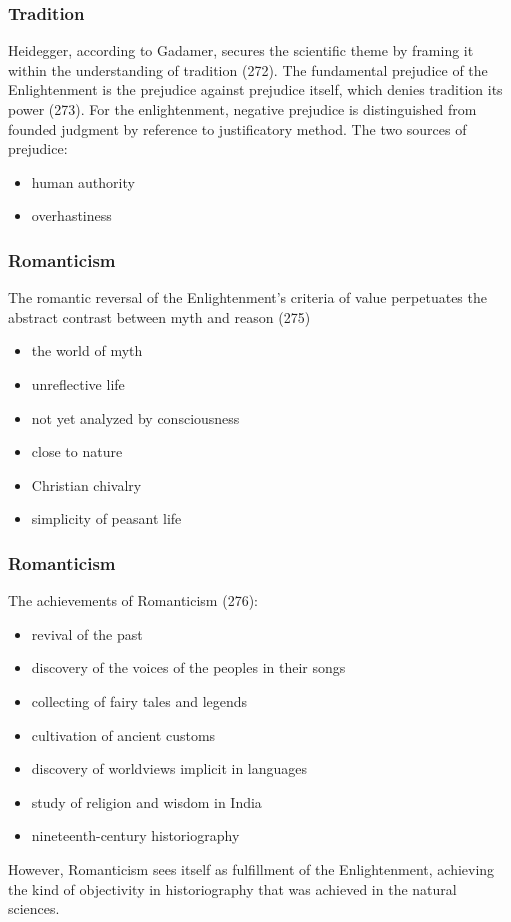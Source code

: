 \documentclass[xcolor=dvipsnames]{beamer}
\begin{document}
\begin{frame}
  \frametitle{Tradition}
  Heidegger, according to Gadamer, secures the scientific theme by
  framing it within the understanding of tradition (272). The
  fundamental prejudice of the Enlightenment is the prejudice against
  prejudice itself, which denies tradition its power (273). For the
  enlightenment, negative prejudice is distinguished from founded
  judgment by reference to justificatory method. The two sources of
  prejudice:
  \begin{itemize}
  \item human authority
  \item overhastiness
  \end{itemize}
\end{frame}

\begin{frame}
  \frametitle{Romanticism}
  The romantic reversal of the Enlightenment's criteria of value
  perpetuates the abstract contrast between myth and reason (275)
  \begin{itemize}
  \item the world of myth
  \item unreflective life
  \item not yet analyzed by consciousness
  \item close to nature
  \item Christian chivalry
  \item simplicity of peasant life
  \end{itemize}
\end{frame}

\begin{frame}
  \frametitle{Romanticism}
  The achievements of Romanticism (276):
  \begin{itemize}
  \item revival of the past
  \item discovery of the voices of the peoples in their songs
  \item collecting of fairy tales and legends
  \item cultivation of ancient customs
  \item discovery of worldviews implicit in languages
  \item study of religion and wisdom in India
  \item nineteenth-century historiography
  \end{itemize}
However, Romanticism sees itself as fulfillment of the Enlightenment,
achieving the kind of objectivity in historiography that was achieved
in the natural sciences.
\end{frame}
\end{document}
